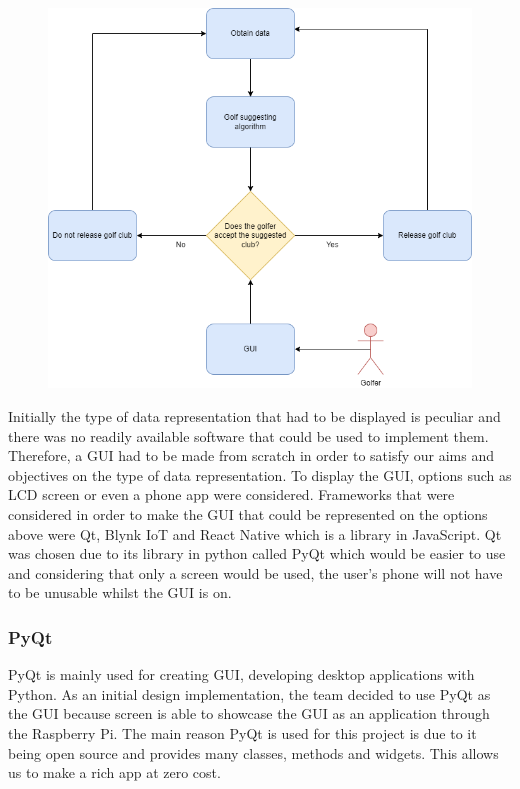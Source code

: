 \documentclass[11pt,landscape]{article}
\begin{document}
\begin{multicols}{3}
\begin{figure}[H]
    \begin{center}
        \includegraphics[]{GUI.png}
    \end{center}
    \label{fig:gui}
\end{figure}

Initially the type of data representation that had to be displayed is peculiar
and there was no readily available software that could be used to implement
them. Therefore, a GUI had to be made from scratch in order to satisfy our aims
and objectives on the type of data representation. To display the GUI, options
such as LCD screen or even a phone app were considered. Frameworks that were
considered in order to make the GUI that could be represented on the options
above were Qt, Blynk IoT and React Native which is a library in JavaScript. Qt
was chosen due to its library in python called PyQt which would be easier to use
and considering that only a screen would be used, the user’s phone will not have
to be unusable whilst the GUI is on. 

\subsubsection{PyQt}
PyQt is mainly used for creating GUI, developing desktop applications with
Python. As an initial design implementation, the team decided to use PyQt as the
GUI because screen is able to showcase the GUI as an application through the
Raspberry Pi. The main reason PyQt is used for this project is due to it being
open source and provides many classes, methods and widgets. This allows us to
make a rich app at zero cost.  


\end{multicols}
\end{document}
